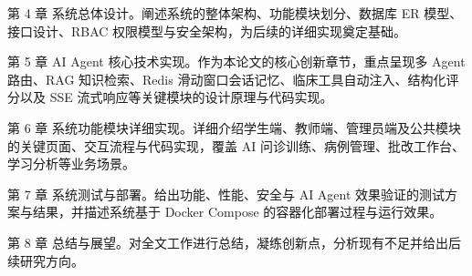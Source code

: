 第 4 章 系统总体设计。阐述系统的整体架构、功能模块划分、数据库 ER 模型、接口设计、RBAC 权限模型与安全架构，为后续的详细实现奠定基础。

第 5 章 AI Agent 核心技术实现。作为本论文的核心创新章节，重点呈现多 Agent 路由、RAG 知识检索、Redis 滑动窗口会话记忆、临床工具自动注入、结构化评分以及 SSE 流式响应等关键模块的设计原理与代码实现。

第 6 章 系统功能模块详细实现。详细介绍学生端、教师端、管理员端及公共模块的关键页面、交互流程与代码实现，覆盖 AI 问诊训练、病例管理、批改工作台、学习分析等业务场景。

第 7 章 系统测试与部署。给出功能、性能、安全与 AI Agent 效果验证的测试方案与结果，并描述系统基于 Docker Compose 的容器化部署过程与运行效果。

第 8 章 总结与展望。对全文工作进行总结，凝练创新点，分析现有不足并给出后续研究方向。

